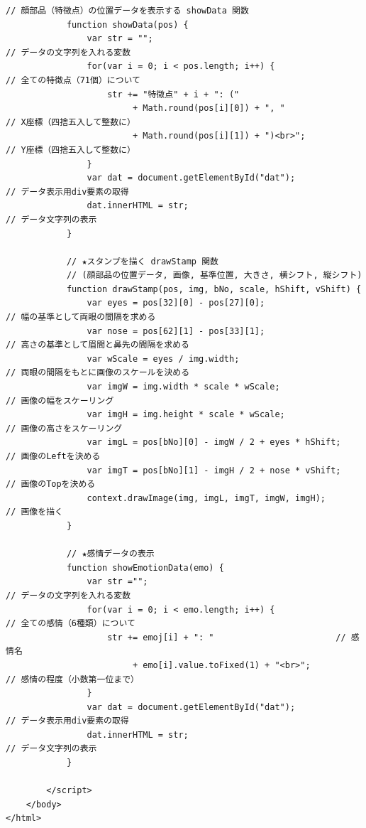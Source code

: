 \documentclass[mingoth,11pt,a4j,uplatex]{jsarticle}
\begin{document}
\begin{lstlisting}[caption=07-05.html]
            // 顔部品（特徴点）の位置データを表示する showData 関数
            function showData(pos) {
                var str = "";                                         // データの文字列を入れる変数
                for(var i = 0; i < pos.length; i++) {                 // 全ての特徴点（71個）について
                    str += "特徴点" + i + ": ("
                         + Math.round(pos[i][0]) + ", "                 // X座標（四捨五入して整数に）
                         + Math.round(pos[i][1]) + ")<br>";             // Y座標（四捨五入して整数に）
                }
                var dat = document.getElementById("dat");             // データ表示用div要素の取得
                dat.innerHTML = str;                                  // データ文字列の表示
            }

            // ★スタンプを描く drawStamp 関数
            // (顔部品の位置データ, 画像, 基準位置, 大きさ, 横シフト, 縦シフト)
            function drawStamp(pos, img, bNo, scale, hShift, vShift) {
                var eyes = pos[32][0] - pos[27][0];                   // 幅の基準として両眼の間隔を求める
                var nose = pos[62][1] - pos[33][1];                   // 高さの基準として眉間と鼻先の間隔を求める
                var wScale = eyes / img.width;                        // 両眼の間隔をもとに画像のスケールを決める
                var imgW = img.width * scale * wScale;                // 画像の幅をスケーリング
                var imgH = img.height * scale * wScale;               // 画像の高さをスケーリング
                var imgL = pos[bNo][0] - imgW / 2 + eyes * hShift;    // 画像のLeftを決める
                var imgT = pos[bNo][1] - imgH / 2 + nose * vShift;    // 画像のTopを決める
                context.drawImage(img, imgL, imgT, imgW, imgH);       // 画像を描く
            }

            // ★感情データの表示
            function showEmotionData(emo) {
                var str ="";                                          // データの文字列を入れる変数
                for(var i = 0; i < emo.length; i++) {                 // 全ての感情（6種類）について
                    str += emoj[i] + ": "                        // 感情名
                         + emo[i].value.toFixed(1) + "<br>";            // 感情の程度（小数第一位まで）
                }
                var dat = document.getElementById("dat");             // データ表示用div要素の取得
                dat.innerHTML = str;                                  // データ文字列の表示
            }
            
        </script>
    </body>
</html>
\end{lstlisting}
\end{document}

